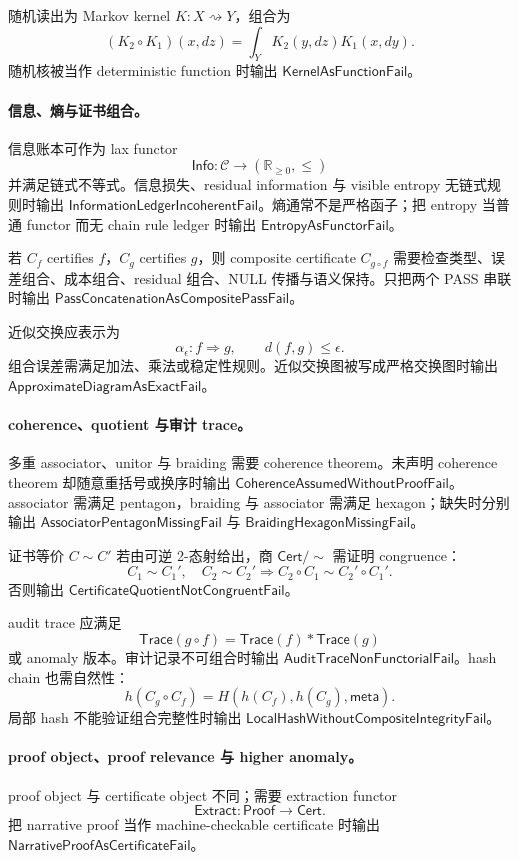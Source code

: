 随机读出为 Markov kernel \(K:X\rightsquigarrow Y\)，组合为
\[
(K_2\circ K_1)(x,dz)=\int_YK_2(y,dz)K_1(x,dy).
\]
随机核被当作 deterministic function 时输出 \(\mathsf{KernelAsFunctionFail}\)。

\paragraph{信息、熵与证书组合。}
信息账本可作为 lax functor
\[
\mathsf{Info}:\mathcal C\to(\mathbb R_{\ge0},\le)
\]
并满足链式不等式。信息损失、residual information 与 visible entropy 无链式规则时输出 \(\mathsf{InformationLedgerIncoherentFail}\)。熵通常不是严格函子；把 entropy 当普通 functor 而无 chain rule ledger 时输出 \(\mathsf{EntropyAsFunctorFail}\)。

若 \(C_f\) certifies \(f\)，\(C_g\) certifies \(g\)，则 composite certificate \(C_{g\circ f}\) 需要检查类型、误差组合、成本组合、residual 组合、NULL 传播与语义保持。只把两个 PASS 串联时输出 \(\mathsf{PassConcatenationAsCompositePassFail}\)。

近似交换应表示为
\[
\alpha_\epsilon:f\Rightarrow g,
\qquad
d(f,g)\le\epsilon.
\]
组合误差需满足加法、乘法或稳定性规则。近似交换图被写成严格交换图时输出 \(\mathsf{ApproximateDiagramAsExactFail}\)。

\paragraph{coherence、quotient 与审计 trace。}
多重 associator、unitor 与 braiding 需要 coherence theorem。未声明 coherence theorem 却随意重括号或换序时输出 \(\mathsf{CoherenceAssumedWithoutProofFail}\)。associator 需满足 pentagon，braiding 与 associator 需满足 hexagon；缺失时分别输出 \(\mathsf{AssociatorPentagonMissingFail}\) 与 \(\mathsf{BraidingHexagonMissingFail}\)。

证书等价 \(C\sim C'\) 若由可逆 2-态射给出，商 \(\mathsf{Cert}/\!\sim\) 需证明 congruence：
\[
C_1\sim C_1',\quad C_2\sim C_2'
\Rightarrow
C_2\circ C_1\sim C_2'\circ C_1'.
\]
否则输出 \(\mathsf{CertificateQuotientNotCongruentFail}\)。

audit trace 应满足
\[
\mathsf{Trace}(g\circ f)=
\mathsf{Trace}(f)\ast\mathsf{Trace}(g)
\]
或 anomaly 版本。审计记录不可组合时输出 \(\mathsf{AuditTraceNonFunctorialFail}\)。hash chain 也需自然性：
\[
h(C_g\circ C_f)=H(h(C_f),h(C_g),\mathsf{meta}).
\]
局部 hash 不能验证组合完整性时输出 \(\mathsf{LocalHashWithoutCompositeIntegrityFail}\)。

\paragraph{proof object、proof relevance 与 higher anomaly。}
proof object 与 certificate object 不同；需要 extraction functor
\[
\mathsf{Extract}:\mathsf{Proof}\to\mathsf{Cert}.
\]
把 narrative proof 当作 machine-checkable certificate 时输出 \(\mathsf{NarrativeProofAsCertificateFail}\)。

